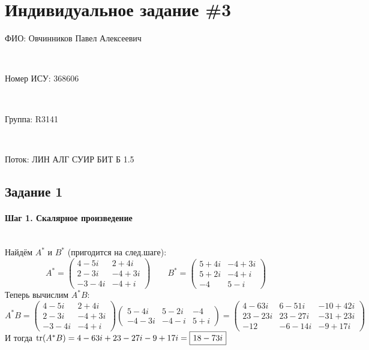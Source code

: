 \documentclass{article}
\newcommand*\squared[1]{\tikz[baseline=(char.base)]{
            \node[shape=rectangle,draw,inner sep=4pt] (char) {#1};}}
\begin{document}
\section*{Индивидуальное задание \#3}
\begin{multicols}{2}
    \noindent\begin{large}ФИО: Овчинников Павел Алексеевич\end{large} \\
    \begin{large}Номер ИСУ: 368606\end{large} \\
    \begin{large}Группа: R3141\end{large} \\
    \begin{large}Поток: ЛИН АЛГ СУИР БИТ Б 1.5\end{large}
\end{multicols}

\subsection*{Задание 1}
\paragraph*{Шаг 1. Скалярное произведение} \, \\
Найдём $A^*$ и $B^*$ (пригодится на след.шаге):
$$
    A^* = \begin{pmatrix}
        4 - 5i  & 2 + 4i  \\
        2 - 3i  & -4 + 3i \\
        -3 - 4i & -4 + i
    \end{pmatrix}\qquad
    B^* = \begin{pmatrix}
        5 + 4i & -4 +3i \\
        5+2i   & -4+i   \\
        -4     & 5-i
    \end{pmatrix}
$$
Теперь вычислим $A^*B$:
$$
    A^*B = \begin{pmatrix}
        4 - 5i  & 2 + 4i  \\
        2 - 3i  & -4 + 3i \\
        -3 - 4i & -4 + i
    \end{pmatrix}\begin{pmatrix}
        5-4i  & 5-2i & -4  \\
        -4-3i & -4-i & 5+i
    \end{pmatrix} = \begin{pmatrix}
        4-63i  & 6-51i  & -10+42i \\
        23-23i & 23-27i & -31+23i \\
        -12    & -6-14i & -9+17i
    \end{pmatrix}
$$
И тогда $\text{tr}(A^*B) = 4-63i + 23-27i -9+17i = \squared{$18-73i$}$
\end{document}

